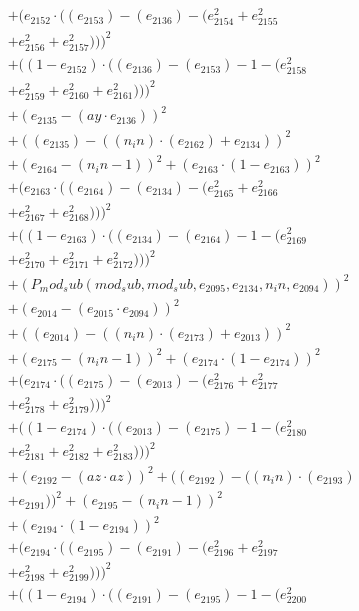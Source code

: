 \documentclass[10pt, a4paper]{article}
\begin{document}
\begin{small}
\begin{align*}
& + (e_{2152}  \cdot  ((e_{2153}) - (e_{2136}) - (e_{2154}^{2} + e_{2155}^{2} \\
& + e_{2156}^{2} + e_{2157}^{2})))^{2} \\
& + ((1 - e_{2152})  \cdot  ((e_{2136}) - (e_{2153}) - 1 - (e_{2158}^{2} \\
& + e_{2159}^{2} + e_{2160}^{2} + e_{2161}^{2})))^{2} \\
& + (e_{2135} - (ay  \cdot  e_{2136}))^{2} \\
& + ((e_{2135}) - ((n_in)  \cdot  (e_{2162}) + e_{2134}))^{2} \\
& + (e_{2164} - (n_in - 1))^{2} + (e_{2163}  \cdot  (1 - e_{2163}))^{2} \\
& + (e_{2163}  \cdot  ((e_{2164}) - (e_{2134}) - (e_{2165}^{2} + e_{2166}^{2} \\
& + e_{2167}^{2} + e_{2168}^{2})))^{2} \\
& + ((1 - e_{2163})  \cdot  ((e_{2134}) - (e_{2164}) - 1 - (e_{2169}^{2} \\
& + e_{2170}^{2} + e_{2171}^{2} + e_{2172}^{2})))^{2} \\
& + (P_mod_sub(mod_sub, mod_sub, e_{2095}, e_{2134}, n_in, e_{2094}))^{2} \\
& + (e_{2014} - (e_{2015}  \cdot  e_{2094}))^{2} \\
& + ((e_{2014}) - ((n_in)  \cdot  (e_{2173}) + e_{2013}))^{2} \\
& + (e_{2175} - (n_in - 1))^{2} + (e_{2174}  \cdot  (1 - e_{2174}))^{2} \\
& + (e_{2174}  \cdot  ((e_{2175}) - (e_{2013}) - (e_{2176}^{2} + e_{2177}^{2} \\
& + e_{2178}^{2} + e_{2179}^{2})))^{2} \\
& + ((1 - e_{2174})  \cdot  ((e_{2013}) - (e_{2175}) - 1 - (e_{2180}^{2} \\
& + e_{2181}^{2} + e_{2182}^{2} + e_{2183}^{2})))^{2} \\
& + (e_{2192} - (az  \cdot  az))^{2} + ((e_{2192}) - ((n_in)  \cdot  (e_{2193}) \\
& + e_{2191}))^{2} + (e_{2195} - (n_in - 1))^{2} \\
& + (e_{2194}  \cdot  (1 - e_{2194}))^{2} \\
& + (e_{2194}  \cdot  ((e_{2195}) - (e_{2191}) - (e_{2196}^{2} + e_{2197}^{2} \\
& + e_{2198}^{2} + e_{2199}^{2})))^{2} \\
& + ((1 - e_{2194})  \cdot  ((e_{2191}) - (e_{2195}) - 1 - (e_{2200}^{2} \\

\end{align*}
\end{small}
\end{document}
